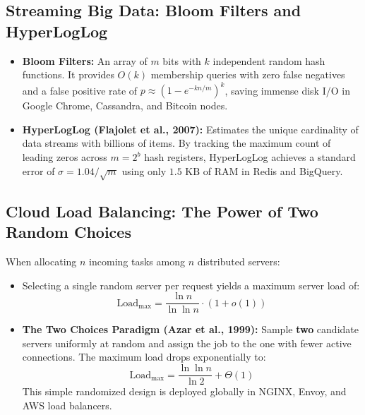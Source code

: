 \documentclass[11pt,a4paper]{article}
\begin{document}
\subsection{Streaming Big Data: Bloom Filters and HyperLogLog}
\begin{itemize}
    \item \textbf{Bloom Filters:} An array of $m$ bits with $k$ independent random hash functions. It provides $O(k)$ membership queries with zero false negatives and a false positive rate of $p \approx (1 - e^{-kn/m})^k$, saving immense disk I/O in Google Chrome, Cassandra, and Bitcoin nodes.
    \item \textbf{HyperLogLog (Flajolet et al., 2007):} Estimates the unique cardinality of data streams with billions of items. By tracking the maximum count of leading zeros across $m = 2^b$ hash registers, HyperLogLog achieves a standard error of $\sigma = 1.04/\sqrt{m}$ using only $1.5\text{ KB}$ of RAM in Redis and BigQuery.
\end{itemize}

\subsection{Cloud Load Balancing: The Power of Two Random Choices}
When allocating $n$ incoming tasks among $n$ distributed servers:
\begin{itemize}
    \item Selecting a single random server per request yields a maximum server load of:
    \begin{equation}
    \text{Load}_{\max} = \frac{\ln n}{\ln \ln n} \cdot (1 + o(1))
    \end{equation}
    \item \textbf{The Two Choices Paradigm (Azar et al., 1999):} Sample \textbf{two} candidate servers uniformly at random and assign the job to the one with fewer active connections. The maximum load drops exponentially to:
    \begin{equation}
    \text{Load}_{\max} = \frac{\ln \ln n}{\ln 2} + \Theta(1)
    \end{equation}
    This simple randomized design is deployed globally in NGINX, Envoy, and AWS load balancers.
\end{itemize}
\end{document}
